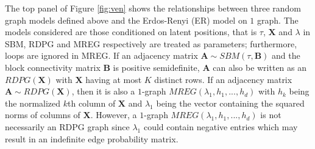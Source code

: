 \documentclass[10pt,journal,compsoc]{IEEEtran}
\newcommand{\bA}{\mathbf{A}}
\newcommand{\bX}{\mathbf{X}}
\newcommand{\bB}{\mathbf{B}}
\begin{document}
\noindent The top panel of Figure \ref{fig:ven} shows the relationships between three random graph models defined above and the Erdos-Renyi (ER) model on $1$ graph. The models considered are those conditioned on latent positions, that is $\tau$, $\bX$ and $\lambda$ in SBM, RDPG and MREG respectively are treated as parameters; furthermore, loops are ignored in MREG. If an adjacency matrix $\bA \sim SBM(\tau,\bB)$ and the block connectivity matrix $\bB$ is positive semidefinite, $\bA$ can also be written as an $RDPG(\bX)$ with $\bX$ having at most $K$ distinct rows. If an adjacency matrix $\bA \sim RDPG(\bX)$, then it is also a $1$-graph $MREG(\lambda_1,h_1,...,h_d)$ with $h_k$ being the normalized $k$th column of $\bX$ and $\lambda_1$ being the vector containing the squared norms of columns of $\bX$. However, a $1$-graph $MREG(\lambda_1,h_1,...,h_d)$ is not necessarily an RDPG graph since $\lambda_1$ could contain negative entries which may result in an indefinite edge probability matrix. \\
\end{document}
